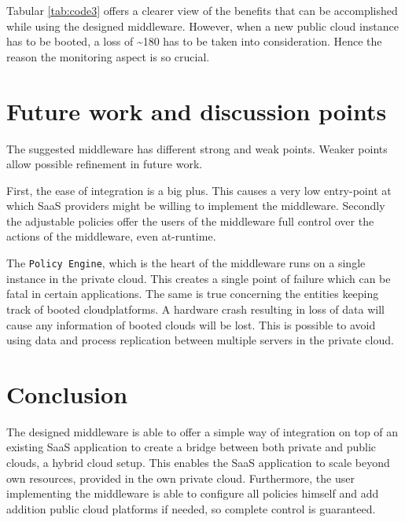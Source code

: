 \documentclass[journal]{IEEEtran}
\begin{document}
Tabular \ref{tab:code3} offers a clearer view of the benefits that can be accomplished while using the designed middleware.
However, when a new public cloud instance has to be booted, a loss of \textasciitilde180 has to be taken into consideration.
Hence the reason the monitoring aspect is so crucial.

\section{Future work and discussion points}\label{discussion}
The suggested middleware has different strong and weak points.
Weaker points allow possible refinement in future work.\newline

First, the ease of integration is a big plus.  
This causes a very low entry-point at which SaaS providers might be willing to implement the middleware.
Secondly the adjustable policies offer the users of the middleware full control over the actions of the middleware, even at-runtime.\newline

The \texttt{Policy Engine}, which is the heart of the middleware runs on a single instance in the private cloud.
This creates a single point of failure which can be fatal in certain applications.
The same is true concerning the entities keeping track of booted cloudplatforms.  
A hardware crash resulting in loss of data will cause any information of booted clouds will be lost.
This is possible to avoid using data and process replication between multiple servers in the private cloud.

\section{Conclusion}
The designed middleware is able to offer a simple way of integration on top of an existing SaaS application to create a bridge between both private and public clouds, a hybrid cloud setup.
This enables the SaaS application to scale beyond own resources, provided in the own private cloud.
Furthermore, the user implementing the middleware is able to configure all policies himself and add addition public cloud platforms if needed, so complete control is guaranteed.





\end{document}
